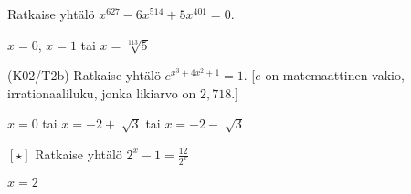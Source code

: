 \begin{tehtava}
	Ratkaise yhtälö $x^{627} - 6x^{514} + 5x^{401} = 0$.
	\begin{vastaus}
		$x = 0$, $x = 1$ tai $x = \sqrt[113]{5}$
	\end{vastaus}
\end{tehtava}

\begin{tehtava}
	(K02/T2b) Ratkaise yhtälö $e^{x^3+4x^2+1}=1$. [$e$ on matemaattinen vakio, irrationaaliluku, jonka likiarvo on $2,718$.]
	\begin{vastaus}
	$x=0$ tai $x=-2 + \sqrt[]{3}$ tai $x=-2 - \sqrt[]{3}$
	\end{vastaus}
\end{tehtava}

\begin{tehtava}
	$[ \star ]$ Ratkaise yhtälö $2^x-1=\frac{12}{2^x}$
	\begin{vastaus}
	$x=2$
	\end{vastaus}
\end{tehtava}
